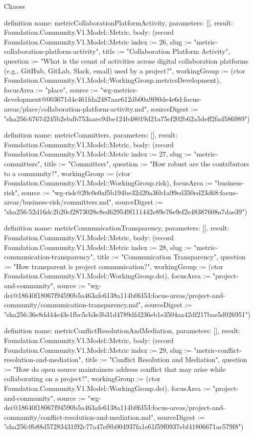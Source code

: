 \begin{lexlean}{Chaoss}
\begin{semanticmodule}
definition{
  name: metricCollaborationPlatformActivity,
  parameters: [],
  result: Foundation.Community.V1.Model::Metric,
  body: (record Foundation.Community.V1.Model::Metric {index := 26, slug := "metric-collaboration-platform-activity", title := "Collaboration Platform Activity", question := "What is the count of activities across digital collaboration platforms (e.g., GitHub, GitLab, Slack, email) used by a project?", workingGroup := (ctor Foundation.Community.V1.Model::WorkingGroup.metricsDevelopment), focusArea := "place", source := "wg-metrics-development@003671d4c461fda2487aae612db00a9f80de4e6d:focus-areas/place/collaboration-platform-activity.md", sourceDigest := "sha256:6767d245b2ebdb753aaec94be124b48019d21a75cf202b62a5deff2fad586989"})
}

definition{
  name: metricCommitters,
  parameters: [],
  result: Foundation.Community.V1.Model::Metric,
  body: (record Foundation.Community.V1.Model::Metric {index := 27, slug := "metric-committers", title := "Committers", question := "How robust are the contributors to a community?", workingGroup := (ctor Foundation.Community.V1.Model::WorkingGroup.risk), focusArea := "business-risk", source := "wg-risk@20c0e0af5b194be32d20a36b1a99ed350ed23d68:focus-areas/business-risk/committers.md", sourceDigest := "sha256:52d16dc2b20cf2873028c8ed629549f111442e89e76e9ef2e48387608a7dae39"})
}

definition{
  name: metricCommunicationTransparency,
  parameters: [],
  result: Foundation.Community.V1.Model::Metric,
  body: (record Foundation.Community.V1.Model::Metric {index := 28, slug := "metric-communication-transparency", title := "Communication Transparency", question := "How transparent is project communication?", workingGroup := (ctor Foundation.Community.V1.Model::WorkingGroup.dei), focusArea := "project-and-community", source := "wg-dei@18640f18067f94590b5a463afe6138a114b0fd53:focus-areas/project-and-community/communication-transparency.md", sourceDigest := "sha256:36e8dd44e43e1fbc5cb3e3b31d4789dfd236eb1e3504aa42df217bae5d026951"})
}

definition{
  name: metricConflictResolutionAndMediation,
  parameters: [],
  result: Foundation.Community.V1.Model::Metric,
  body: (record Foundation.Community.V1.Model::Metric {index := 29, slug := "metric-conflict-resolution-and-mediation", title := "Conflict Resolution and Mediation", question := "How do open source maintainers address conflict that may arise while collaborating on a project?", workingGroup := (ctor Foundation.Community.V1.Model::WorkingGroup.dei), focusArea := "project-and-community", source := "wg-dei@18640f18067f94590b5a463afe6138a114b0fd53:focus-areas/project-and-community/conflict-resolution-and-mediation.md", sourceDigest := "sha256:0b88d57283431f92c77a47ef8b004937fa1e61f59f0937ebf41806671ac579f8"})
}


\end{semanticmodule}
\end{lexlean}

